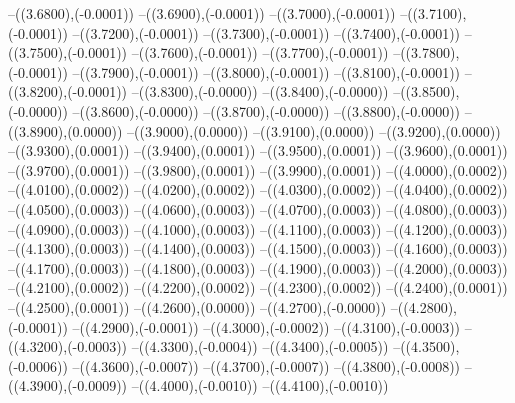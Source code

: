 {	--({\sx*(3.6800)},{\sy*(-0.0001)})
	--({\sx*(3.6900)},{\sy*(-0.0001)})
	--({\sx*(3.7000)},{\sy*(-0.0001)})
	--({\sx*(3.7100)},{\sy*(-0.0001)})
	--({\sx*(3.7200)},{\sy*(-0.0001)})
	--({\sx*(3.7300)},{\sy*(-0.0001)})
	--({\sx*(3.7400)},{\sy*(-0.0001)})
	--({\sx*(3.7500)},{\sy*(-0.0001)})
	--({\sx*(3.7600)},{\sy*(-0.0001)})
	--({\sx*(3.7700)},{\sy*(-0.0001)})
	--({\sx*(3.7800)},{\sy*(-0.0001)})
	--({\sx*(3.7900)},{\sy*(-0.0001)})
	--({\sx*(3.8000)},{\sy*(-0.0001)})
	--({\sx*(3.8100)},{\sy*(-0.0001)})
	--({\sx*(3.8200)},{\sy*(-0.0001)})
	--({\sx*(3.8300)},{\sy*(-0.0000)})
	--({\sx*(3.8400)},{\sy*(-0.0000)})
	--({\sx*(3.8500)},{\sy*(-0.0000)})
	--({\sx*(3.8600)},{\sy*(-0.0000)})
	--({\sx*(3.8700)},{\sy*(-0.0000)})
	--({\sx*(3.8800)},{\sy*(-0.0000)})
	--({\sx*(3.8900)},{\sy*(0.0000)})
	--({\sx*(3.9000)},{\sy*(0.0000)})
	--({\sx*(3.9100)},{\sy*(0.0000)})
	--({\sx*(3.9200)},{\sy*(0.0000)})
	--({\sx*(3.9300)},{\sy*(0.0001)})
	--({\sx*(3.9400)},{\sy*(0.0001)})
	--({\sx*(3.9500)},{\sy*(0.0001)})
	--({\sx*(3.9600)},{\sy*(0.0001)})
	--({\sx*(3.9700)},{\sy*(0.0001)})
	--({\sx*(3.9800)},{\sy*(0.0001)})
	--({\sx*(3.9900)},{\sy*(0.0001)})
	--({\sx*(4.0000)},{\sy*(0.0002)})
	--({\sx*(4.0100)},{\sy*(0.0002)})
	--({\sx*(4.0200)},{\sy*(0.0002)})
	--({\sx*(4.0300)},{\sy*(0.0002)})
	--({\sx*(4.0400)},{\sy*(0.0002)})
	--({\sx*(4.0500)},{\sy*(0.0003)})
	--({\sx*(4.0600)},{\sy*(0.0003)})
	--({\sx*(4.0700)},{\sy*(0.0003)})
	--({\sx*(4.0800)},{\sy*(0.0003)})
	--({\sx*(4.0900)},{\sy*(0.0003)})
	--({\sx*(4.1000)},{\sy*(0.0003)})
	--({\sx*(4.1100)},{\sy*(0.0003)})
	--({\sx*(4.1200)},{\sy*(0.0003)})
	--({\sx*(4.1300)},{\sy*(0.0003)})
	--({\sx*(4.1400)},{\sy*(0.0003)})
	--({\sx*(4.1500)},{\sy*(0.0003)})
	--({\sx*(4.1600)},{\sy*(0.0003)})
	--({\sx*(4.1700)},{\sy*(0.0003)})
	--({\sx*(4.1800)},{\sy*(0.0003)})
	--({\sx*(4.1900)},{\sy*(0.0003)})
	--({\sx*(4.2000)},{\sy*(0.0003)})
	--({\sx*(4.2100)},{\sy*(0.0002)})
	--({\sx*(4.2200)},{\sy*(0.0002)})
	--({\sx*(4.2300)},{\sy*(0.0002)})
	--({\sx*(4.2400)},{\sy*(0.0001)})
	--({\sx*(4.2500)},{\sy*(0.0001)})
	--({\sx*(4.2600)},{\sy*(0.0000)})
	--({\sx*(4.2700)},{\sy*(-0.0000)})
	--({\sx*(4.2800)},{\sy*(-0.0001)})
	--({\sx*(4.2900)},{\sy*(-0.0001)})
	--({\sx*(4.3000)},{\sy*(-0.0002)})
	--({\sx*(4.3100)},{\sy*(-0.0003)})
	--({\sx*(4.3200)},{\sy*(-0.0003)})
	--({\sx*(4.3300)},{\sy*(-0.0004)})
	--({\sx*(4.3400)},{\sy*(-0.0005)})
	--({\sx*(4.3500)},{\sy*(-0.0006)})
	--({\sx*(4.3600)},{\sy*(-0.0007)})
	--({\sx*(4.3700)},{\sy*(-0.0007)})
	--({\sx*(4.3800)},{\sy*(-0.0008)})
	--({\sx*(4.3900)},{\sy*(-0.0009)})
	--({\sx*(4.4000)},{\sy*(-0.0010)})
	--({\sx*(4.4100)},{\sy*(-0.0010)})
}
